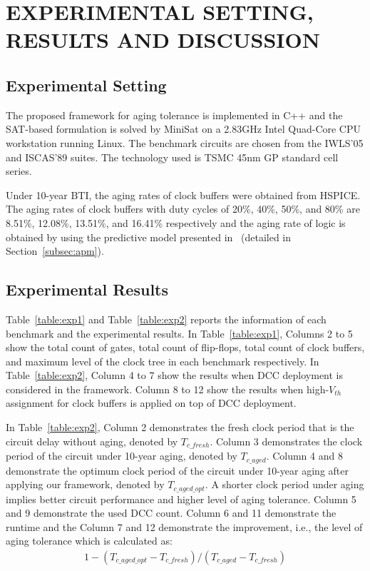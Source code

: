 \section{EXPERIMENTAL SETTING, RESULTS AND DISCUSSION}
\label{sec:exp}
\subsection{Experimental Setting}
The proposed framework for aging tolerance is implemented in C++ and the SAT-based formulation is solved by MiniSat on a 2.83GHz Intel Quad-Core CPU workstation running Linux. The benchmark circuits are chosen from the IWLS'05 and ISCAS'89 suites. The technology used is TSMC 45nm GP standard cell series.

Under 10-year BTI, the aging rates of clock buffers were obtained from HSPICE. The aging rates of clock buffers with duty cycles of 20\%, 40\%, 50\%, and 80\% are 8.51\%, 12.08\%, 13.51\%, and 16.41\% respectively and the aging rate of logic is obtained by using the predictive model presented in~\cite{wang2010impact, wang2007efficient, gomez2016early, amrouch2016reliability} (detailed in Section~\ref{subsec:apm}).


\subsection{Experimental Results}
Table~\ref{table:exp1} and Table~\ref{table:exp2} reports the information of each benchmark and the experimental results. In Table~\ref{table:exp1}, Columns 2 to 5 show the total count of gates, total count of flip-flops, total count of clock buffers, and maximum level of the clock tree in each benchmark respectively. In Table~\ref{table:exp2}, Column 4 to 7 show the results when DCC deployment is considered in the framework. Column 8 to 12 show the results when high-$V_{th}$ assignment for clock buffers is applied on top of DCC deployment.

In Table~\ref{table:exp2}, Column 2  demonstrates the fresh clock period that is the circuit delay without aging, denoted by $T_{c\_fresh}$. Column 3 demonstrates the clock period of the circuit under 10-year aging, denoted by $T_{c\_aged}$. Column 4 and 8 demonstrate the optimum clock period of the circuit under 10-year aging after applying our framework, denoted by $T_{c\_aged\_opt}$. A shorter clock period under aging implies better circuit performance and higher level of aging tolerance. Column 5 and 9 demonstrate the used DCC count. Column 6 and 11 demonstrate the runtime and the Column 7 and 12 demonstrate the improvement, i.e., the level of aging tolerance which is calculated as:
\begin{gather*}
1 - (T_{c\_aged\_opt} - T_{c\_fresh}) / (T_{c\_aged} - T_{c\_fresh})
\end{gather*}

